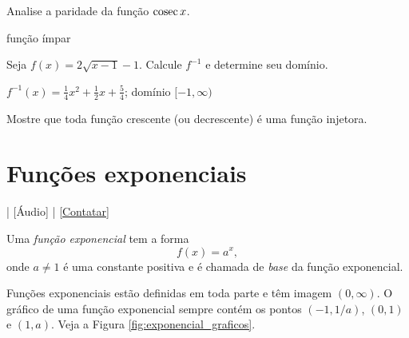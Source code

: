 \begin{exer}
  Analise a paridade da função $\operatorname{cosec} x$.
\end{exer}
\begin{resp}
  função ímpar
\end{resp}

\begin{exer}
  Seja $f(x) = 2\sqrt{x-1}-1$. Calcule $f^{-1}$ e determine seu domínio.
\end{exer}
\begin{resp}
  $f^{-1}(x) = \frac{1}{4}x^2 + \frac{1}{2}x + \frac{5}{4}$; domínio $[-1, \infty)$
\end{resp}

\begin{exer}
  Mostre que toda função crescente (ou decrescente) é uma função injetora.
\end{exer}

\section{Funções exponenciais}\label{cap_funcao_sec_funexp}

\begin{flushright}
  [Vídeo] | [Áudio] | \href{https://phkonzen.github.io/notas/contato.html}{[Contatar]}
\end{flushright}

Uma \emph{função exponencial} tem a forma
\begin{equation}
  f(x) = a^x,
\end{equation}
onde $a\neq 1$ é uma constante positiva e é chamada de \emph{base} da função exponencial.

Funções exponenciais estão definidas em toda parte e têm imagem $(0, \infty)$. O gráfico de uma função exponencial sempre contém os pontos $(-1,1/a)$, $(0,1)$ e $(1,a)$. Veja a Figura \ref{fig:exponencial_graficos}.

